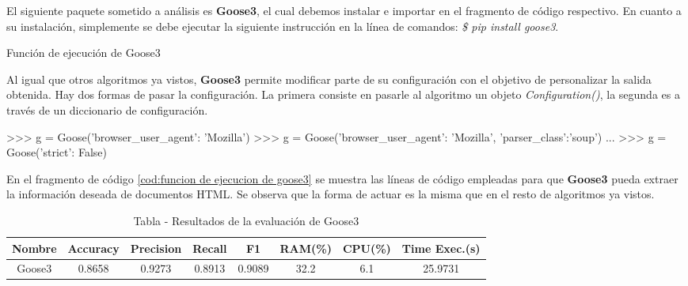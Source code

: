 El siguiente paquete sometido a análisis es \textbf{Goose3}, el cual debemos instalar e importar en el 
fragmento de código respectivo. En cuanto a su instalación, simplemente se debe ejecutar la siguiente 
instrucción en la línea de comandos: \emph{\$ pip install goose3}.

\begin{codefloat}
    
    \caption{Función de ejecución de Goose3}
    \label{cod:funcion de ejecucion de goose3}
\end{codefloat}

Al igual que otros algoritmos ya vistos, \textbf{Goose3} permite modificar parte de su configuración con el
objetivo de personalizar la salida obtenida. Hay dos formas de pasar la configuración. La primera consiste
en pasarle al algoritmo un objeto \emph{Configuration()}, la segunda es a través de un diccionario de 
configuración.

\begin{Schunk}
    \begin{Soutput}
    >>> g = Goose({'browser_user_agent': 'Mozilla'})
    >>> g = Goose({'browser_user_agent': 'Mozilla', 'parser_class':'soup'})
    ...
    >>> g = Goose({'strict': False})
    \end{Soutput}
\end{Schunk}

En el fragmento de código \ref{cod:funcion de ejecucion de goose3} se muestra las líneas de código empleadas
para que \textbf{Goose3} pueda extraer la información deseada de documentos HTML. Se observa que la forma
de actuar es la misma que en el resto de algoritmos ya vistos. 

\begin{table}[h]
    \begin{center}
      \begin{tabular}{| c | c | c | c | c | c | c | c |} \hline 
       \textbf{Nombre} & \textbf{Accuracy} & \textbf{Precision}  & \textbf{Recall} & \textbf{F1} & \textbf{RAM(\%)} & \textbf{CPU(\%)} & \textbf{Time Exec.(s)} \\ \hline
       Goose3 & 0.8658 & 0.9273 & 0.8913 & 0.9089 & 32.2 & 6.1 & 25.9731 \\ \hline
      \end{tabular}
      \caption{Tabla - Resultados de la evaluación de Goose3}
      \label{tab:tabla - resultados de la evaluacion de goose3}
    \end{center}
\end{table}

